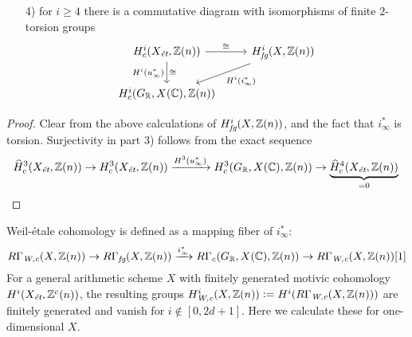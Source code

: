 \documentclass{article}
\numberwithin{equation}{section}
\begin{document}
\begin{lemma}
\begin{enumerate}
    \item[4)] for $i \ge 4$ there is a commutative diagram with isomorphisms of
    finite $2$-torsion groups
    \[ \begin{tikzcd}
        H^i_c (X_\et, \ZZ(n)) \ar{r}{\cong}\ar{d}{\cong}[swap]{H^i (u^*_\infty)} &
        H^i_\fg (X, \ZZ(n)) \ar{dl}{H^i (i^*_\infty)} \\
        H^i_c (G_\RR, X(\CC), \ZZ(n))
      \end{tikzcd} \]
  \end{enumerate}

  \begin{proof}
    Clear from the above calculations of $H^i_\fg (X, \ZZ(n))$, and the fact
    that $i^*_\infty$ is torsion. Surjectivity in part 3) follows from the exact
    sequence
    \[ \widehat{H}^3_c (X_\et, \ZZ(n)) \to
      H^3_c (X_\et, \ZZ(n)) \xrightarrow{H^3 (u^*_\infty)}
      H^3_c (G_\RR, X(\CC), \ZZ(n)) \to
      \underbrace{\widehat{H}^4_c (X_\et, \ZZ(n))}_{= 0} \qedhere \]
  \end{proof}
\end{lemma}

Weil-étale cohomology is defined as a mapping fiber of $i^*_\infty$:
\[ R\Gamma_\Wc (X, \ZZ(n)) \to
  R\Gamma_\fg (X, \ZZ(n)) \xrightarrow{i^*_\infty}
  R\Gamma_c (G_\RR, X(\CC), \ZZ(n)) \to
  R\Gamma_\Wc (X, \ZZ(n)) [1] \]
For a general arithmetic scheme $X$ with finitely generated motivic cohomology
$H^i (X_\et, \ZZ^c(n))$, the resulting groups
$H^i_\Wc (X, \ZZ(n)) \dfn H^i (R\Gamma_\Wc (X, \ZZ(n)))$ are finitely generated
and vanish for $i \notin [0,2d+1]$. Here we calculate these for one-dimensional $X$.
\end{document}
